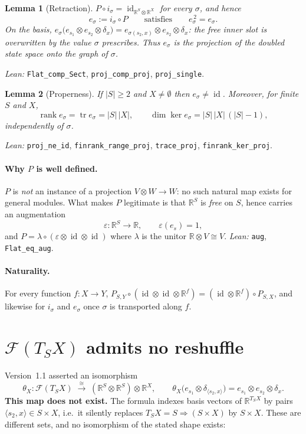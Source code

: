 \documentclass[12pt]{article}
\theoremstyle{plain}
\newtheorem{lemma}{Lemma}
\theoremstyle{remark}
\newcommand{\id}{\operatorname{id}}
\newcommand{\RR}{\mathbb R}
\begin{document}
\begin{lemma}[Retraction]
$P\circ i_\sigma=\id_{\RR^{S}\otimes\RR^{X}}$ for every $\sigma$, and hence
\[
e_\sigma:=i_\sigma\circ P
\qquad\text{satisfies}\qquad
e_\sigma^{\,2}=e_\sigma .
\]
On the basis, $e_\sigma\bigl(e_{s_1}\otimes e_{s_2}\otimes\delta_x\bigr)
= e_{\sigma(s_2,x)}\otimes e_{s_2}\otimes\delta_x$: the free inner slot is
overwritten by the value $\sigma$ prescribes. Thus $e_\sigma$ is the projection
of the doubled state space onto the \emph{graph of $\sigma$}.
\end{lemma}
\emph{Lean:} \verb|Flat_comp_Sect|, \verb|proj_comp_proj|, \verb|proj_single|.

\begin{lemma}[Properness]
If $|S|\ge 2$ and $X\neq\emptyset$ then $e_\sigma\neq\id$. Moreover, for finite
$S$ and $X$,
\[
\operatorname{rank}e_\sigma=\operatorname{tr}e_\sigma=|S|\,|X|,
\qquad
\dim\ker e_\sigma=|S|\,|X|\,(|S|-1),
\]
independently of $\sigma$.
\end{lemma}
\emph{Lean:} \verb|proj_ne_id|, \verb|finrank_range_proj|, \verb|trace_proj|,
\verb|finrank_ker_proj|.

\paragraph{Why $P$ is well defined.}
$P$ is \emph{not} an instance of a projection $V\otimes W\to W$: no such natural
map exists for general modules. What makes $P$ legitimate is that $\RR^{S}$ is
\emph{free} on $S$, hence carries an augmentation
\[
\varepsilon:\RR^{S}\to\RR,\qquad \varepsilon(e_s)=1,
\]
and $P=\lambda\circ(\varepsilon\otimes\id\otimes\id)$ where $\lambda$ is the
unitor $\RR\otimes V\cong V$. \emph{Lean:} \verb|aug|, \verb|Flat_eq_aug|.

\paragraph{Naturality.}
For every function $f:X\to Y$, $P_{S,Y}\circ(\id\otimes\id\otimes\RR^{f})
=(\id\otimes\RR^{f})\circ P_{S,X}$, and likewise for $i_\sigma$ and $e_\sigma$
once $\sigma$ is transported along $f$.

\bigskip
\section{\texorpdfstring{$\mathcal F(T_SX)$}{F(T\_S X)} admits no reshuffle}
\label{sec:noreshuffle}

Version~1.1 asserted an isomorphism
\[
\theta_X:\mathcal F(T_S X)\;\xrightarrow{\ \cong\ }\;
(\RR^{S}\otimes\RR^{S})\otimes\RR^{X},
\qquad
\theta_X\bigl(e_{s_1}\otimes\delta_{\langle s_2,x\rangle}\bigr)
=e_{s_1}\otimes e_{s_2}\otimes\delta_x .
\]
\textbf{This map does not exist.} The formula indexes basis vectors of
$\RR^{T_SX}$ by pairs $\langle s_2,x\rangle\in S\times X$, i.e.\ it silently
replaces $T_SX=S\Rightarrow(S\times X)$ by $S\times X$. These are different
sets, and no isomorphism of the stated shape exists:
\end{document}
